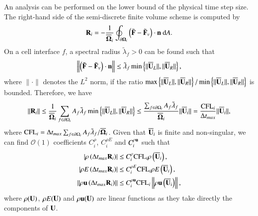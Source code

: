 An analysis can be performed on the lower bound of the physical time step size.
The right-hand side of the semi-discrete finite volume scheme is computed by
\begin{equation}
    \label{eq:Semi-FV-1}
    \mathbf{R}_i = -\frac{1}{\overline{\mathbf{\Omega}}_i} \oint_{\partial \mathbf{\Omega}_i} \left(\tilde{\mathbf{F}} - \tilde{\mathbf{F}}_v \right) \cdot \mathbf{n} \ \dd A.
\end{equation}
On a cell interface $f$, a spectral radius $\tilde{\lambda}_f>0$ can be found such that
\begin{equation}
    \left\| \left(\tilde{\mathbf{F}} - \tilde{\mathbf{F}}_v \right) \cdot \mathbf{n} \right\| \leq \tilde{\lambda}_f \min \left\{\|\overline{\mathbf{U}}_L\|, \|\overline{\mathbf{U}}_R\| \right\},
\end{equation}
where $\|\cdot\|$ denotes the $L^2$ norm, if the ratio $\max \left\{\|\overline{\mathbf{U}}_L\|, \|\overline{\mathbf{U}}_R\| \right\}/\min \left\{\|\overline{\mathbf{U}}_L\|, \|\overline{\mathbf{U}}_R\| \right\}$ is bounded.
Therefore, we have
\begin{equation}
\label{eq:upper-bound-residual}
    \left\| \mathbf{R}_i \right\| 
    \leq \frac{1}{\overline{\mathbf{\Omega}}_i} \sum_{f \in \partial \Omega_i}{
        A_{f} \tilde{\lambda}_{f} \min \left\{\|\overline{\mathbf{U}}_L\|, \|\overline{\mathbf{U}}_R\| \right\}
    } 
    \leq \frac{\sum_{f \in \partial \Omega_i} A_f\tilde{\lambda}_f}{\overline{\mathbf{\Omega}}_i}\|\overline{\mathbf{U}}_i\|
    =
    \frac{\text{CFL}_i}{\mathrm\Delta t_{max}}\|\overline{\mathbf{U}}_i\|,
\end{equation}
where $\text{CFL}_i= \mathrm\Delta t_{max}\sum_{f \in \partial \Omega_i} A_f \tilde{\lambda}_f/\overline{\mathbf{\Omega}}_i$. 
Given that $\overline{\mathbf{U}}_i$ is finite and non-singular, we can find $\mathcal{O}(1)$ coefficients $C^{\rho}_i$, $C^{\rho E}_i$ and $C^{\rho \mathbf{u}}_i$ such that
\begin{equation}
    \begin{aligned}
    \label{eq:inc_upper_cond_const_coef}
        \left| \rho\left( \mathrm\Delta t_{max} \mathbf{R}_i \right) \right|
        & \leq
        C^\rho_i    \text{CFL}_i \rho\left( \overline{\mathbf{U}}_i \right),\\
        \left| \rho E\left( \mathrm\Delta t_{max} \mathbf{R}_i \right) \right|
        & \leq
        C^{\rho E}_i \text{CFL}_i \rho E\left( \overline{\mathbf{U}}_i \right),\\
        \left\| \rho \mathbf{u}\left( \mathrm\Delta t_{max} \mathbf{R}_i \right) \right\|
        & \leq 
        C^{\rho \mathbf{u}}_i \text{CFL}_i  \left\| \rho \mathbf{u}\left( \overline{\mathbf{U}}_i \right)              \right\|,\\
    \end{aligned}
\end{equation}
where $\rho(\mathbf{U})$, $\rho E(\mathbf{U})$ and $\rho \mathbf{u}(\mathbf{U})$ are linear functions as they take directly the components of $\mathbf{U}$.
